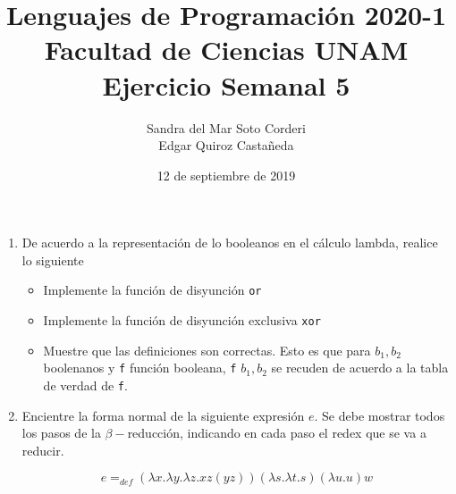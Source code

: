 \documentclass{article}
\title{
    Lenguajes de Programación 2020-1 \\
    Facultad de Ciencias UNAM \\
    Ejercicio Semanal 5
}
\author{
    Sandra del Mar Soto Corderi \\
    Edgar Quiroz Castañeda
}
\date{
    12 de septiembre de 2019
}
\begin{document}
    \maketitle
    \begin{enumerate}
        \item {
            De acuerdo a la representación de lo booleanos en el cálculo lambda,
            realice lo siguiente
            \begin{itemize}
                \item {
                    Implemente la función de disyunción \texttt{or}
                }
                \item {
                    Implemente la función de disyunción exclusiva \texttt{xor}
                }
                \item {
                    Muestre que las definiciones son correctas. Esto es que para
                    $b_1, b_2$ boolenanos y \texttt{f} función booleana,
                    \texttt{f} $b_1, b_2$ se recuden de acuerdo a la tabla de
                    verdad de \texttt{f}. 
                }
            \end{itemize}
        }

        \item {
            Encientre la forma normal de la siguiente expresión $e$. Se debe
            mostrar todos los pasos de la $\beta-$reducción, indicando en cada
            paso el redex que se va a reducir.

            \[
                e =_{def} (\lambda x. \lambda y. \lambda z.xz(yz))
                (\lambda s. \lambda t.s)
                (\lambda u. u) w
            \]
        }
    \end{enumerate}
\end{document}
